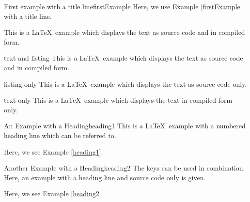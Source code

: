 \begin{dispExample}
\begin{texexptitled}{First example with a title line}{firstExample}
Here, we use Example \ref{firstExample} with a title line.
\end{texexptitled}
\end{dispExample}


\begin{dispExample}
\begin{texexp}{}
This is a \LaTeX\ example which displays the text as source code
and in compiled form.
\end{texexp}
\end{dispExample}


\begin{dispExample}
\begin{texexp}{text and listing}
This is a \LaTeX\ example which displays the text as source code
and in compiled form.
\end{texexp}
\end{dispExample}


\begin{dispExample}
\begin{texexp}{listing only}
This is a \LaTeX\ example which displays the text as source code only.
\end{texexp}
\end{dispExample}


\begin{dispExample}
\begin{texexp}{text only}
This is a \LaTeX\ example which displays the text in compiled form only.
\end{texexp}
\end{dispExample}


\begin{dispExample}
\begin{texexptitled}{An Example with a Heading}{heading1}
This is a \LaTeX\ example with a numbered heading line
which can be referred to.
\end{texexptitled}
Here, we see Example \ref{heading1}.
\end{dispExample}


\begin{dispExample}
\begin{texexptitled}{Another Example with a Heading}{heading2}
The keys can be used in combination. Here, an example with a heading line
and source code only is given.
\end{texexptitled}
Here, we see Example \ref{heading2}.
\end{dispExample}


